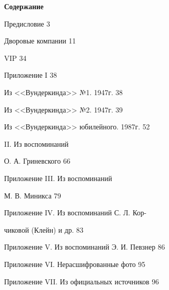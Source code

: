 \documentclass[utf8x, 12pt, twoside, a5paper]{G7-32} %
\begin{document}
\begin{center}

    \textbf{\Large Содержание}

    \indent

    Предисловие \hfill 3
    
    Дворовые компании \hfill 11
    
    VIP \hfill 34
    
    Приложение I \hfill 38
    
    \hspace{20pt} Из <<Вундеркинда>> №1. 1947г. \hfill 38
    
    \hspace{20pt} Из <<Вундеркинда>> №2. 1947г. \hfill 39
    
    \hspace{20pt} Из <<Вундеркинда>> юбилейного. 1987г. \hfill 52
    
    
    { II. Из воспоминаний 
    
    }
    
    \hspace{93pt}О. А. Гриневского \hfill 66
    
    {\raggedright Приложение III. Из воспоминаний
    
    } 
    \hspace{93pt}М. В. Миникса \hfill 79
   
    {\raggedright Приложение IV. Из воспоминаний С. Л. Кор-
    
    }
    
    \hspace{93pt}чиковой (Клейн) и др. \hfill 83
    
    Приложение V. Из воспоминаний Э. И. Певзнер \hfill 86
    
    Приложение VI. Нерасшифрованные фото \hfill 95    
    
    Приложение VII. Из официальных источников \hfill 96
    
\end{center}
\end{document}
